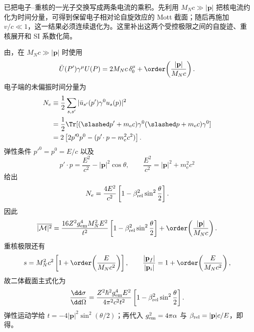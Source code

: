 \begin{exbox}
\medskip

 已把电子--重核的一光子交换写成两条电流的乘积。先利用 $M_Nc\gg|\mathbf p|$ 把核电流约化为时间分量，可得到保留电子相对论自旋效应的 Mott 截面；随后再施加 $v/c\ll1$，这一结果必须连续退化为。这里补出这两个受控极限之间的自旋迹、重核展开和 SI 系数化简。



由，在 $M_Nc\gg|\mathbf p|$ 时使用
\begin{equation*}
 \bar U(P')\gamma^\mu U(P)
 =2M_Nc\,\delta_0^\mu
 +\order\!\left(\frac{|\mathbf p|}{M_Nc}\right).
\end{equation*}
电子端的未偏振时间分量为
\begin{align*}
 N_e
 &\equiv\frac12\sum_{s,s'}
 |\bar u_{s'}(p')\gamma^0u_s(p)|^2\\
 &=\frac12\Tr[(\slashed p'+m_{\mathrm e} c)\gamma^0
 (\slashed p+m_{\mathrm e} c)\gamma^0]\\
 &=2\left[2p'^0p^0-(p'\!\cdot p-m_{\mathrm e}^2c^2)\right].
\end{align*}
弹性条件 $p'^0=p^0=E/c$ 以及
\begin{equation*}
 p'\!\cdot p=\frac{E^2}{c^2}-|\mathbf p|^2\cos\theta,
 \qquad
 \frac{E^2}{c^2}=|\mathbf p|^2+m_{\mathrm e}^2c^2
\end{equation*}
给出
\begin{equation*}
 N_e
 =\frac{4E^2}{c^2}
 \left[1-\beta_{\rm rel}^2\sin^2\frac\theta2\right].
\end{equation*}
因此
\begin{equation*}
 \overline{|\mathcal M|^2}
 =\frac{16Z^2g_{\rm em}^4M_N^2E^2}{t^2}
 \left[1-\beta_{\rm rel}^2\sin^2\frac\theta2\right]
 +\order\!\left(\frac{|\mathbf p|}{M_Nc}\right).
\end{equation*}
重核极限还有
\begin{equation*}
 s=M_N^2c^2\left[1+\order\!\left(\frac{E}{M_Nc^2}\right)\right],
 \qquad
 \frac{|\mathbf p_f|}{|\mathbf p_i|}=1+\order\!\left(\frac{E}{M_Nc^2}\right),
\end{equation*}
故二体截面主式化为
\begin{equation*}
 \frac{\dd\sigma}{\dd\Omega}
 =\frac{Z^2\hbar^2g_{\rm em}^4E^2}
 {4\pi^2c^2t^2}
 \left[1-\beta_{\rm rel}^2\sin^2\frac\theta2\right].
\end{equation*}
弹性运动学给 $t=-4|\mathbf p|^2\sin^2(\theta/2)$；再代入 $g_{\rm em}^2=4\pi\alpha$ 与 $\beta_{\rm rel}=|\mathbf p|c/E$，即得。


\end{exbox}
